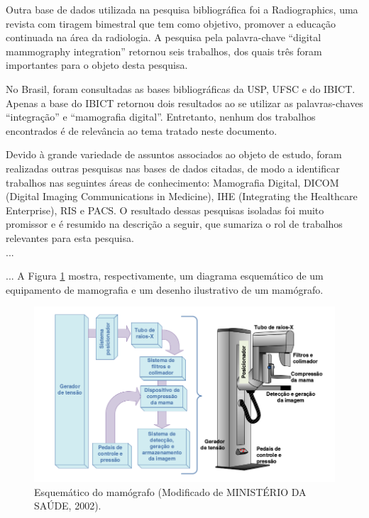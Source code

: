 Outra base de dados utilizada na pesquisa bibliográfica foi a Radiographics, uma
revista com tiragem bimestral que tem como objetivo, promover a educação continuada na
área da radiologia. A pesquisa pela palavra-chave “digital mammography integration”
retornou seis trabalhos, dos quais três foram importantes para o objeto desta pesquisa.

No Brasil, foram consultadas as bases bibliográficas da USP, UFSC e do IBICT.
Apenas a base do IBICT retornou dois resultados ao se utilizar as palavras-chaves
“integração” e “mamografia digital”. Entretanto, nenhum dos trabalhos encontrados é de
relevância ao tema tratado neste documento.

Devido à grande variedade de assuntos associados ao objeto de estudo, foram
realizadas outras pesquisas nas bases de dados citadas, de modo a identificar trabalhos nas
seguintes áreas de conhecimento: Mamografia Digital, DICOM (Digital Imaging
Communications in Medicine), IHE (Integrating the Healthcare Enterprise), RIS e PACS.
O resultado dessas pesquisas isoladas foi muito promissor e é resumido na descrição a
seguir, que sumariza o rol de trabalhos relevantes para esta pesquisa.\\
...

...
A Figura \ref{esquematico} mostra, respectivamente, um diagrama esquemático de um equipamento de
mamografia e um desenho ilustrativo de um mamógrafo.

\begin{figure}[ht]
 \centering
 \includegraphics[width=15 cm]{figuras/fig1}
 \caption{Esquemático do mamógrafo (Modificado de MINISTÉRIO DA SAÚDE, 2002).}
 \label{esquematico}
\end{figure}





